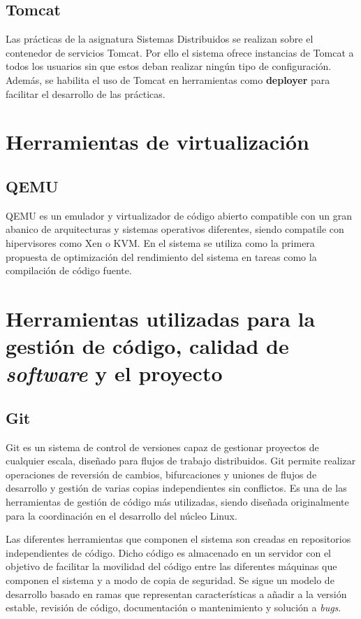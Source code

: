 \subsection{Tomcat}

Las prácticas de la asignatura Sistemas Distribuidos se realizan sobre el contenedor de servicios Tomcat. Por ello el sistema ofrece instancias de Tomcat a todos los usuarios sin que estos deban realizar ningún tipo de configuración. Además, se habilita el uso de Tomcat en herramientas como \textbf{deployer} para facilitar el desarrollo de las prácticas.

\section{Herramientas de virtualización}

\subsection{QEMU}

QEMU es un emulador y virtualizador de código abierto compatible con un gran abanico de arquitecturas y sistemas operativos diferentes, siendo compatile con hipervisores como Xen o KVM. En el sistema se utiliza como la primera propuesta de optimización del rendimiento del sistema en tareas como la compilación de código fuente.

\section{Herramientas utilizadas para la gestión de código, calidad de \textit{software} y el proyecto}

\subsection{Git}

Git es un sistema de control de versiones capaz de gestionar proyectos de cualquier escala, diseñado para flujos de trabajo distribuidos. Git permite realizar operaciones de reversión de cambios, bifurcaciones y uniones de flujos de desarrollo y gestión de varias copias independientes sin conflictos. Es una de las herramientas de gestión de código más utilizadas, siendo diseñada originalmente para la coordinación en el desarrollo del núcleo Linux.

Las diferentes herramientas que componen el sistema son creadas en repositorios independientes de código. Dicho código es almacenado en un servidor con el objetivo de facilitar la movilidad del código entre las diferentes máquinas que componen el sistema y a modo de copia de seguridad. Se sigue un modelo de desarrollo basado en ramas que representan características a añadir a la versión estable, revisión de código, documentación o mantenimiento y solución a \textit{bugs}.

